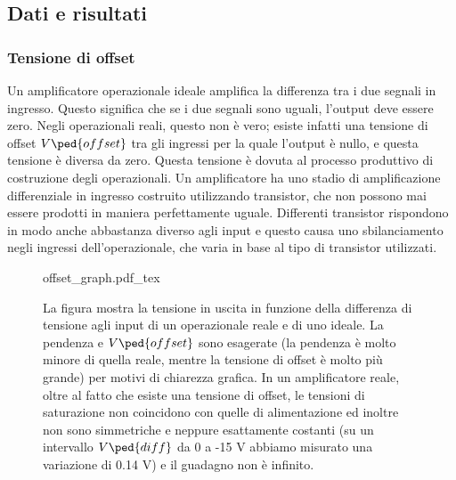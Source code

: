 \subsection{Dati e risultati}

\subsubsection{Tensione di offset}

Un amplificatore operazionale ideale amplifica la differenza tra i due segnali
in ingresso. Questo significa che se i due segnali sono uguali, l'output deve essere zero.
Negli operazionali reali, questo non è vero; esiste infatti una tensione di offset
$V\ped{offset}$ tra gli ingressi per la quale l'output è nullo, e questa tensione è diversa da zero.
Questa tensione è dovuta al processo produttivo di costruzione degli operazionali.
Un amplificatore ha uno stadio di amplificazione differenziale in ingresso costruito utilizzando
transistor, che non possono mai essere prodotti in maniera perfettamente uguale. Differenti
transistor rispondono in modo anche abbastanza diverso agli input e questo causa uno sbilanciamento
negli ingressi dell'operazionale, che varia in base al tipo di transistor utilizzati.

\begin{figure}[H]
    \def\svgwidth{0.5\textwidth}
    {offset_graph.pdf_tex}
    \caption{La figura mostra la tensione in uscita in funzione della differenza di tensione agli input di 
        un operazionale reale e di uno ideale. La pendenza e $V\ped{offset}$ sono esagerate
        (la pendenza è molto minore di quella reale, mentre la tensione di offset è molto più grande) per
        motivi di chiarezza grafica. In un amplificatore reale, oltre
        al fatto che esiste una tensione di offset, le tensioni di saturazione non coincidono con quelle
        di alimentazione ed inoltre non sono simmetriche e neppure esattamente costanti (su un intervallo
        $V\ped{diff}$ da 0 a -15 V abbiamo misurato una variazione di 0.14 V) e il guadagno non è infinito. }
    \label{fig:v_offset_graph}
\end{figure}

